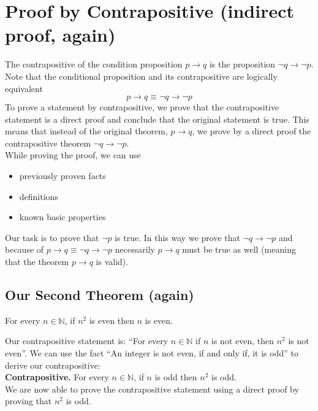 \section{Proof by Contrapositive (indirect proof, again)}
The contrapositive of the condition proposition $p \rightarrow q$ is the proposition $\neg q \rightarrow \neg p$. Note that the conditional proposition and its contrapositive are logically equivalent
\[p \rightarrow q  \equiv \neg q \rightarrow \neg p \]
To prove a statement by contrapositive, we prove that the contrapositive statement is a direct proof and conclude that the original statement is true. This means that instead of the original theorem, $p \rightarrow q$, we prove by a direct proof the contrapositive theorem $\neg q \rightarrow \neg p$.\\

While proving the proof, we can use
\begin{itemize}
    \item previously proven facts
    \item definitions
    \item known basic properties
\end{itemize}

Our task is to prove that $\neg p$ is true. In this way we prove that $\neg q \rightarrow \neg p$ and because of $p \rightarrow q \equiv \neg q \rightarrow \neg p $ necessarily $p \rightarrow q$ must be true as well (meaning that the theorem $p \rightarrow q$ is valid). 
\subsection{Our Second Theorem (again)}
\begin{theorem}
    For every $n \in \mathbb{N}$, if $n^2$ is even then $n$ is even.
\end{theorem}
Our contrapositive statement is: ``For every $n \in \mathbb{N}$ if $n$ is not even, then $n^2$ is not even''. We can use the fact ``An integer is not even, if and only if, it is odd'' to derive our contrapositive:\\

\textbf{Contrapositive.} For every $n \in \mathbb{N}$, if $n$ is odd then $n^2$ is odd. \\

We are now able to prove the contrapositive statement using a direct proof by proving that $n^2$ is odd. 

